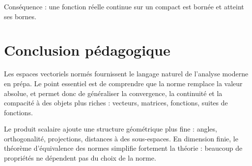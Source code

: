 \documentclass[11pt,a4paper]{article}
\begin{document}
Conséquence :
une fonction réelle continue sur un compact est bornée et atteint ses bornes.

\section*{Conclusion pédagogique}

Les espaces vectoriels normés fournissent le langage naturel de l'analyse moderne en prépa.  
Le point essentiel est de comprendre que la norme remplace la valeur absolue, et permet donc de généraliser la convergence, la continuité et la compacité à des objets plus riches : vecteurs, matrices, fonctions, suites de fonctions.

Le produit scalaire ajoute une structure géométrique plus fine : angles, orthogonalité, projections, distances à des sous-espaces.  
En dimension finie, le théorème d'équivalence des normes simplifie fortement la théorie : beaucoup de propriétés ne dépendent pas du choix de la norme.
\end{document}
